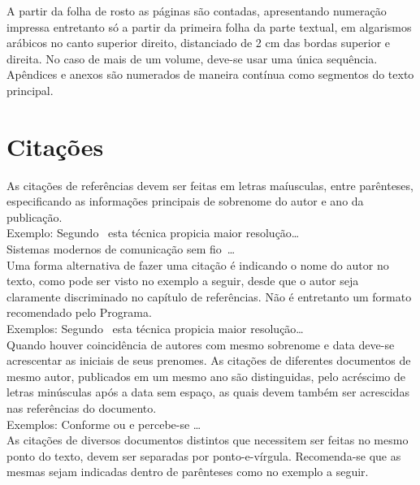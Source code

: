 \documentclass[repeatfields,xlists,xpacks,oneside,yearsonly]{ufrgscca}
\begin{document}
A partir da folha de rosto as páginas são contadas, apresentando numeração
impressa entretanto só a partir da primeira folha da parte textual, em
algarismos arábicos no canto superior direito, distanciado de 2 cm das
bordas superior e direita. No caso de mais de um volume, deve-se usar uma
única sequência. Apêndices e anexos são numerados de maneira contínua como
segmentos do texto principal.

\section{Citações}

As citações de referências devem ser feitas em letras maíusculas, entre
parênteses, especificando as informações principais de sobrenome do autor e
ano da publicação.\\

Exemplo: Segundo~\cite{Brito:IEE-1994} esta técnica propicia maior
resolução\ldots\\

Sistemas modernos de comunicação sem fio~\cite{Bilstrup:FCS-239}\ldots\\

Uma forma alternativa de fazer uma citação é indicando o nome do autor no
texto, como pode ser visto no exemplo a seguir, desde que o autor seja
claramente discriminado no capítulo de referências. Não é entretanto um
formato recomendado pelo Programa.\\

Exemplos: Segundo~\textcite{Brito:IEE-1994} esta técnica propicia maior
resolução\ldots\\

Quando houver coincidência de autores com mesmo sobrenome e data deve-se
acrescentar as iniciais de seus prenomes. As citações de diferentes
documentos de mesmo autor, publicados em um mesmo ano são distinguidas, pelo
acréscimo de letras minúsculas após a data sem espaço, as quais devem também
ser acrescidas nas referências do documento.\\

Exemplos: Conforme \cite{Pereira:OORT1999-133} ou \cite{Pereira:OORT1999-155} e
\cite{Pereira:RTP1999-9} percebe-se \ldots\\

As citações de diversos documentos distintos que necessitem ser feitas no
mesmo ponto do texto, devem ser separadas por ponto-e-vírgula. Recomenda-se
que as mesmas sejam indicadas dentro de parênteses como no exemplo a
seguir.\\
\end{document}
